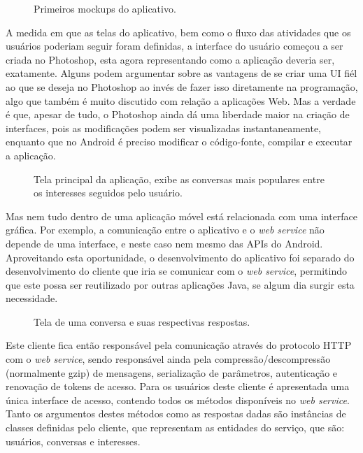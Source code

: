 \documentclass[diss]{template/setrem}
\begin{document}
\begin{figure}[!h]
    
    \caption{Primeiros mockups do aplicativo.}
    \label{fig:mockup}
\end{figure}

A medida em que as telas do aplicativo, bem como o fluxo das atividades que os usuários poderiam seguir foram definidas, a interface do usuário começou a ser criada no Photoshop, esta agora representando como a aplicação deveria ser, exatamente. Alguns podem argumentar sobre as vantagens de se criar uma UI fiél ao que se deseja no Photoshop ao invés de fazer isso diretamente na programação, algo que também é muito discutido com relação a aplicações Web. Mas a verdade é que, apesar de tudo, o Photoshop ainda dá uma liberdade maior na criação de interfaces, pois as modificações podem ser visualizadas instantaneamente, enquanto que no Android é preciso modificar o código-fonte, compilar e executar a aplicação.

\begin{figure}[!h]
    \caption{Tela principal da aplicação, exibe as conversas mais populares entre os interesses seguidos pelo usuário.}
    \label{fig:mobile-feed}
\end{figure}

Mas nem tudo dentro de uma aplicação móvel está relacionada com uma interface gráfica. Por exemplo, a comunicação entre o aplicativo e o \emph{web service} não depende de uma interface, e neste caso nem mesmo das APIs do Android. Aproveitando esta oportunidade, o desenvolvimento do aplicativo foi separado do desenvolvimento do cliente que iria se comunicar com o \emph{web service}, permitindo que este possa ser reutilizado por outras aplicações Java, se algum dia surgir esta necessidade.

\begin{figure}[!h]
    \caption{Tela de uma conversa e suas respectivas respostas.}
    \label{fig:mobile-conversation}
\end{figure}

Este cliente fica então responsável pela comunicação através do protocolo HTTP com o \emph{web service}, sendo responsável ainda pela compressão/descompressão (normalmente gzip) de mensagens, serialização de parâmetros, autenticação e renovação de tokens de acesso. Para os usuários deste cliente é apresentada uma única interface de acesso, contendo todos os métodos disponíveis no \emph{web service}. Tanto os argumentos destes métodos como as respostas dadas são instâncias de classes definidas pelo cliente, que representam as entidades do serviço, que são: usuários, conversas e interesses.
\end{document}
